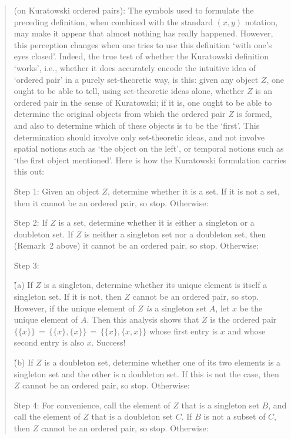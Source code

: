 \V
\V

\begin{quotation}
{\footnotesize \underline{\Note} (on Kuratowski ordered pairs):
    The symbols used to formulate the preceding definition, when combined with the standard $(x,y)$ notation,
    may make it appear that almost nothing has really happened. However, this perception changes when one tries to use this definition `with one's eyes closed'.
    Indeed, the true test of whether the Kuratowski definition `works', i.e., whether it does accurately encode the intuitive idea of `ordered pair'
    in a purely set-theoretic way, is this: given any object $Z$, one ought to be able to tell,
    using set-theoretic ideas alone, whether $Z$ is an ordered pair in the sense of Kuratowski;
    if it is, one ought to be able to determine the original objects from which the ordered pair $Z$ is formed,
    and also to determine which of these objects is to be the `first'.
    This determination should involve only set-theoretic ideas, and not involve spatial notions such as `the object on the left',
    or temporal notions such as `the first object mentioned'. Here is how the Kuratowski formulation carries this out:

       \h Step 1: Given an object $Z$, determine whether it is a set.
    If it is not a set, then it cannot be an ordered pair, so stop. Otherwise:

       \h Step 2: If $Z$ is a set, determine whether it is either a singleton or a doubleton set.
    If $Z$ is neither a singleton set nor a doubleton set, then (Remark~2 above) it cannot be an ordered pair, so stop. Otherwise:

       \h Step 3:

            \h \h (a) If $Z$ is a singleton, determine whether its unique element is itself a singleton set.
    If it is not, then $Z$ cannot be an ordered pair, so stop. However, if the unique element of $Z$ {\em is} a singleton set $A$,
    let $x$ be the unique element of $A$. Then this analysis shows that $Z$ is the ordered pair $\{\{x\}\} \,=\, \{\{x\},\{x\}\} \,=\, \{\{x\},\{x,x\}\}$ 
    whose first entry is $x$ and whose second entry is also $x$. Success!

        \h \h (b) If $Z$ is a doubleton set, determine whether one of its two elements is a singleton set and the other is a doubleton set.
    If this is not the case, then $Z$ cannot be an ordered pair, so stop. Otherwise:

        Step 4: For convenience, call the element of $Z$ that is a singleton set $B$, and call the element of $Z$ that is a doubleton set $C$.
    If $B$ is not a subset of $C$, then $Z$ cannot be an ordered pair, so stop. Otherwise:

}
\end{quotation}
